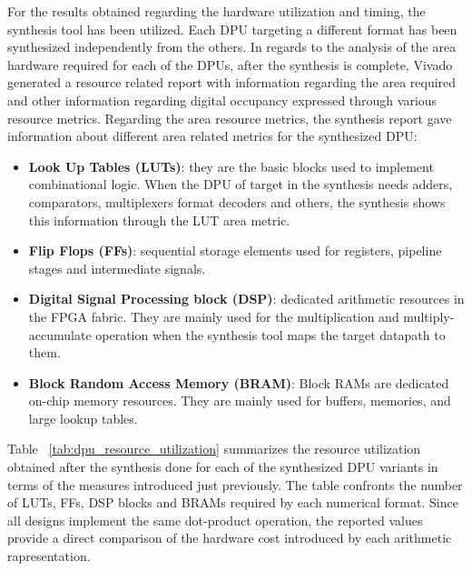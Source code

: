 For the results obtained regarding the hardware utilization and timing, the synthesis tool has been utilized. Each DPU targeting a different format has been synthesized independently from the others. In regards to the analysis of the area hardware required for each of the DPUs, after the synthesis is complete, Vivado generated a resource related report with information regarding the area required and other information regarding digital occupancy expressed through various resource metrics. Regarding the area resource metrics, the synthesis report gave  information about different area related metrics for the synthesized DPU: 
\begin{itemize} 
    \item  \textbf{Look Up Tables (LUTs)}: they are the basic blocks used to implement combinational logic. When the DPU of target in the synthesis needs adders, comparators, multiplexers format decoders and others, the synthesis shows this information through the LUT area metric.
    \item \textbf{Flip Flops (FFs)}: sequential storage elements used for registers, pipeline stages and intermediate signals.
    \item \textbf{Digital Signal Processing block (DSP)}: dedicated arithmetic resources in the FPGA fabric. They are mainly used for the multiplication and multiply-accumulate operation when the synthesis tool maps the target datapath to them.
    \item \textbf{Block Random Access Memory (BRAM)}: Block RAMs are dedicated on-chip memory resources. They are mainly used for buffers, memories, and large lookup tables.
\end{itemize}


Table ~\ref{tab:dpu_resource_utilization} summarizes the resource utilization obtained after the synthesis done for each of the synthesized DPU variants in terms of the measures introduced just previously. The table confronts the number of LUTs, FFs, DSP blocks and BRAMs required by each numerical format. Since all designs implement the same dot-product operation, the reported values provide a direct comparison of the hardware cost introduced by each arithmetic rapresentation. 

